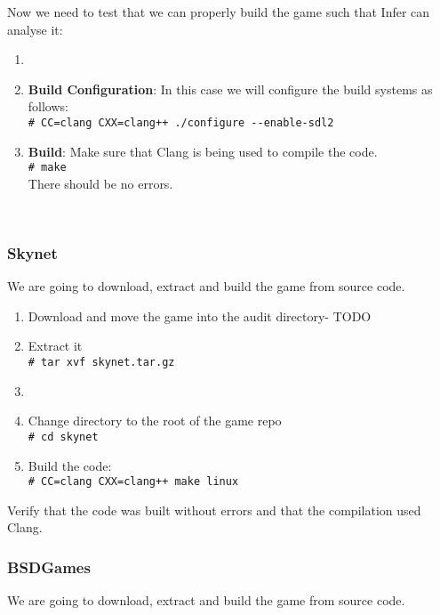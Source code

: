 \vspace{0.5cm}

Now we need to test that we can properly build the game such that Infer can analyse it:

\begin{enumerate}
	\item {}
	\item\textbf{ Build Configuration}: In this case we will configure the build systems as follows:\\
	\verb|# CC=clang CXX=clang++ ./configure --enable-sdl2|
	\item \textbf{Build}: Make sure that Clang is being used to compile the code.\\
	\verb|# make| \\
	There should be no errors.
\end{enumerate}\

\subsubsection{Skynet}

We are going to download, extract and build the game from source code.


\begin{enumerate}
	\itemsep0em
	\item Download and move the game into the audit directory- TODO 
	\item Extract it\\
	\verb|# tar xvf skynet.tar.gz|
	\item {}
	\item Change directory to the root of the game repo	\\
	\verb|# cd skynet|	
	\item Build the code:\\
	\verb|# CC=clang CXX=clang++ make linux|
\end{enumerate}

Verify that the code was built without errors and that the compilation used Clang.

\subsubsection{BSDGames}

We are going to download, extract and build the game from source code.

